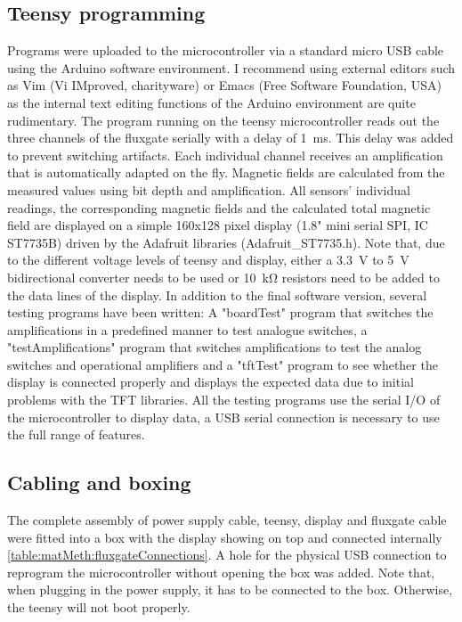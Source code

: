         \subsection{Teensy programming}
        Programs were uploaded to the microcontroller via a standard micro USB cable using the Arduino software environment. I recommend using external editors such as Vim (Vi IMproved, charityware) or Emacs (Free Software Foundation, USA) as the internal text editing functions of the Arduino environment are quite rudimentary. The program running on the teensy microcontroller reads out the three channels of the fluxgate serially with a delay of \SI{1}{\milli\second}. This delay was added to prevent switching artifacts. Each individual channel receives an amplification that is automatically adapted on the fly. Magnetic fields are calculated from the measured values using bit depth and amplification. All sensors' individual readings, the corresponding magnetic fields and the calculated total magnetic field are displayed on a simple 160x128 pixel display (1.8" mini serial SPI, IC ST7735B) driven by the Adafruit libraries (Adafruit\_ST7735.h). Note that, due to the different voltage levels of teensy and display, either a \SI{3.3}{\volt} to \SI{5}{\volt} bidirectional converter needs to be used or \SI{10}{\kilo\ohm} resistors need to be added to the data lines of the display. In addition to the final software version, several testing programs have been written: A "boardTest" program that switches the amplifications in a predefined manner to test analogue switches, a "testAmplifications" program that switches amplifications to test the analog switches and operational amplifiers and a "tftTest" program to see whether the display is connected properly and displays the expected data due to initial problems with the TFT libraries. All the testing programs use the serial I/O of the microcontroller to display data, a USB serial connection is necessary to use the full range of features.
        \subsection{Cabling and boxing}
        The complete assembly of power supply cable, teensy, display and fluxgate cable were fitted into a box with the display showing on top and connected internally \ref{table:matMeth:fluxgateConnections}. A hole for the physical USB connection to reprogram the microcontroller without opening the box was added. Note that, when plugging in the power supply, it has to be connected to the box. Otherwise, the teensy will not boot properly.
